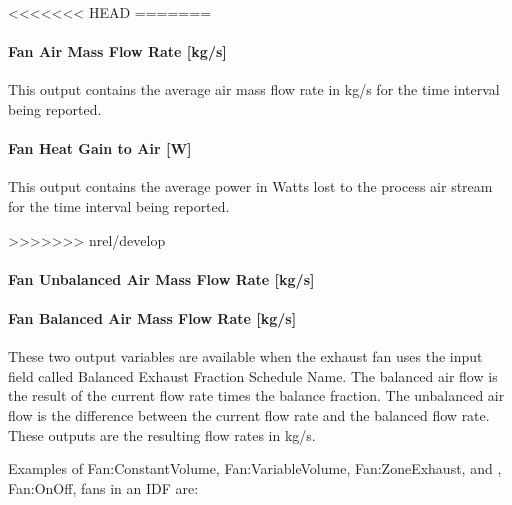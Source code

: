 <<<<<<< HEAD
=======
\paragraph{Fan Air Mass Flow Rate {[}kg/s{]}}\label{fan-air-mass-flow-kgs-3}

This output contains the average air mass flow rate in kg/s for the time interval being reported.

\paragraph{Fan Heat Gain to Air {[}W{]}}\label{fan-heat-gain-to-air-w-3}

This output contains the average power in Watts lost to the process air stream for the time interval being reported.

>>>>>>> nrel/develop
\paragraph{Fan Unbalanced Air Mass Flow Rate {[}kg/s{]}}\label{fan-unbalanced-air-mass-flow-rate-kgs}

\paragraph{Fan Balanced Air Mass Flow Rate {[}kg/s{]}}\label{fan-balanced-air-mass-flow-rate-kgs}

These two output variables are available when the exhaust fan uses the input field called Balanced Exhaust Fraction Schedule Name. The balanced air flow is the result of the current flow rate times the balance fraction. The unbalanced air flow is the difference between the current flow rate and the balanced flow rate. These outputs are the resulting flow rates in kg/s.

Examples of Fan:ConstantVolume, Fan:VariableVolume, Fan:ZoneExhaust, and , Fan:OnOff, fans in an IDF are:

